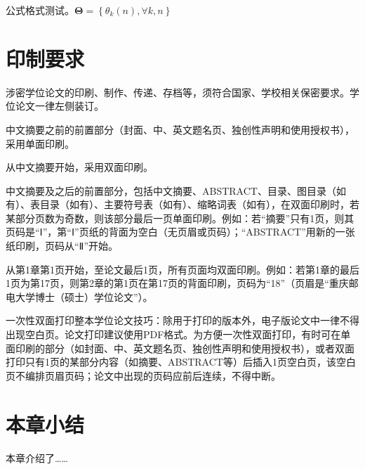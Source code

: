 	
	
	
	\noindent
	公式格式测试。${\mathbf{\Theta }} = \left\{ {{\theta _k}\left( n \right),\forall k,n} \right\}$
	
	\section{印制要求}
	涉密学位论文的印刷、制作、传递、存档等，须符合国家、学校相关保密要求。学位论文一律左侧装订。
	
	中文摘要之前的前置部分（封面、中、英文题名页、独创性声明和使用授权书），采用单面印刷。
	
	从中文摘要开始，采用双面印刷。
	
	中文摘要及之后的前置部分，包括中文摘要、ABSTRACT、目录、图目录（如有）、表目录（如有）、主要符号表（如有）、缩略词表（如有），在双面印刷时，若某部分页数为奇数，则该部分最后一页单面印刷。例如：若“摘要”只有1页，则其页码是“Ⅰ”，第“Ⅰ”页纸的背面为空白（无页眉或页码）；“ABSTRACT”用新的一张纸印刷，页码从“Ⅱ”开始。
	
	从第1章第1页开始，至论文最后1页，所有页面均双面印刷。例如：若第1章的最后1页为第17页，则第2章的第1页在第17页的背面印刷，页码为“18”（页眉是“重庆邮电大学博士（硕士）学位论文”）。
	
	一次性双面打印整本学位论文技巧：除用于打印的版本外，电子版论文中一律不得出现空白页。论文打印建议使用PDF格式。为方便一次性双面打印，有时可在单面印刷的部分（如封面、中、英文题名页、独创性声明和使用授权书），或者双面打印只有1页的某部分内容（如摘要、ABSTRACT等）后插入1页空白页，该空白页不编排页眉页码；论文中出现的页码应前后连续，不得中断。
	
	
	\section{本章小结}
	本章介绍了……